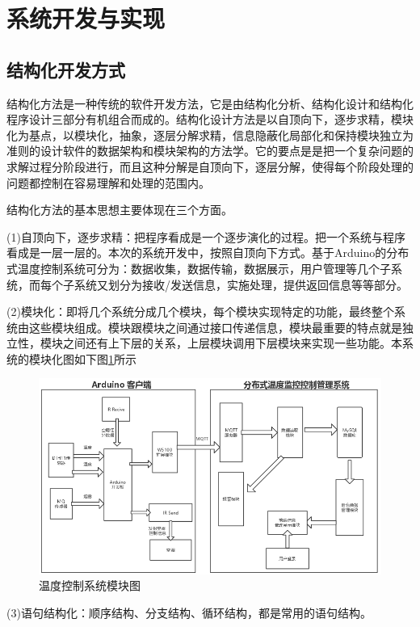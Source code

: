 \section{系统开发与实现}

\subsection{结构化开发方式}

结构化方法是一种传统的软件开发方法，它是由结构化分析、结构化设计和结构化程序设计三部分有机组合而成的。结构化设计方法是以自顶向下，逐步求精，模块化为基点，以模块化，抽象，逐层分解求精，信息隐蔽化局部化和保持模块独立为准则的设计软件的数据架构和模块架构的方法学。它的要点是是把一个复杂问题的求解过程分阶段进行，而且这种分解是自顶向下，逐层分解，使得每个阶段处理的问题都控制在容易理解和处理的范围内。

结构化方法的基本思想主要体现在三个方面。

(1)自顶向下，逐步求精：把程序看成是一个逐步演化的过程。把一个系统与程序看成是一层一层的。本次的系统开发中，按照自顶向下方式。基于Arduino的分布式温度控制系统可分为：数据收集，数据传输，数据展示，用户管理等几个子系统，而每个子系统又划分为接收/发送信息，实施处理，提供返回信息等等部分。

(2)模块化：即将几个系统分成几个模块，每个模块实现特定的功能，最终整个系统由这些模块组成。模块跟模块之间通过接口传递信息，模块最重要的特点就是独立性，模块之间还有上下层的关系，上层模块调用下层模块来实现一些功能。本系统的模块化图如下图\ref{fig:4-1}所示

\begin{figure}[htbp]
	\centering
	\includegraphics[width=\linewidth]{figure/4-1}
	\caption{温度控制系统模块图}
	\label{fig:4-1}
\end{figure}

(3)语句结构化：顺序结构、分支结构、循环结构，都是常用的语句结构。

